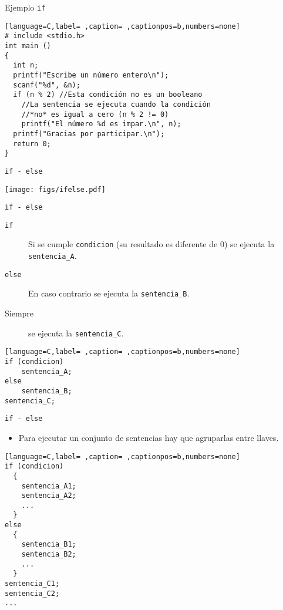 \documentclass[usenames,svgnames,dvipsnames, aspectratio=169]{beamer}
\begin{document}
\begin{frame}[label={sec:org5b30bb7},fragile]{Ejemplo \texttt{if}}
 \begin{lstlisting}[language=C,label= ,caption= ,captionpos=b,numbers=none]
# include <stdio.h>
int main ()
{
  int n;
  printf("Escribe un número entero\n");
  scanf("%d", &n);
  if (n % 2) //Esta condición no es un booleano
    //La sentencia se ejecuta cuando la condición
    //*no* es igual a cero (n % 2 != 0)
    printf("El número %d es impar.\n", n);
  printf("Gracias por participar.\n");
  return 0;
}
\end{lstlisting}
\end{frame}



\begin{frame}[label={sec:org719734a},fragile]{\texttt{if - else}}
 \begin{center}
\texttt{[image: figs/ifelse.pdf]}
\end{center}
\end{frame}


\begin{frame}[label={sec:orgfa018e2},fragile]{\texttt{if - else}}
 \begin{description}
\item[{\texttt{if}}] Si se cumple \texttt{condicion} (su resultado es \alert{diferente de 0}) se ejecuta la \texttt{sentencia\_A}.
\item[{\texttt{else}}] En caso contrario se ejecuta la \texttt{sentencia\_B}.
\item[{Siempre}] se ejecuta la \texttt{sentencia\_C}.
\end{description}
\begin{lstlisting}[language=C,label= ,caption= ,captionpos=b,numbers=none]
if (condicion)
    sentencia_A;
else
    sentencia_B;
sentencia_C;
\end{lstlisting}
\end{frame}
\begin{frame}[label={sec:orgf3248c5},fragile]{\texttt{if - else}}
 \begin{itemize}
\item Para ejecutar un conjunto de sentencias hay que agruparlas \alert{entre llaves}.
\end{itemize}
\begin{lstlisting}[language=C,label= ,caption= ,captionpos=b,numbers=none]
if (condicion)
  {
    sentencia_A1;
    sentencia_A2;
    ...
  }
else
  {
    sentencia_B1;
    sentencia_B2;
    ...    
  }
sentencia_C1;
sentencia_C2;
...
\end{lstlisting}
\end{frame}
\end{document}
